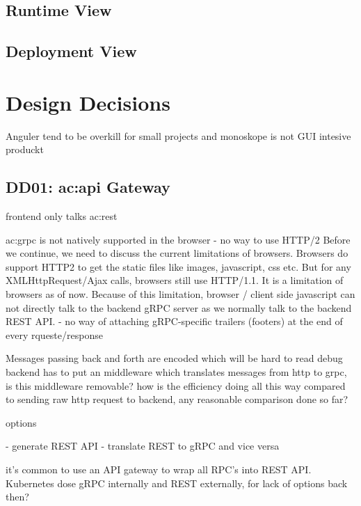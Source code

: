 \subsection{Runtime View}

\subsection{Deployment View}

\section{Design Decisions}

Anguler tend to be overkill for small projects and monoskope is not GUI intesive produckt

\subsection{DD01: \gls{ac:api} Gateway}

frontend only talks \gls{ac:rest}


\gls{ac:grpc} is not natively supported in the browser 
- no way to use HTTP/2
Before we continue, we need to discuss the current limitations of browsers. Browsers do support HTTP2 to get the static files like images, javascript, css etc. But for any XMLHttpRequest/Ajax calls, browsers still use HTTP/1.1. It is a limitation of browsers as of now. Because of this limitation, browser / client side javascript can not directly talk to the backend gRPC server as we normally talk to the backend REST API. 
- no way of attaching gRPC-specific trailers (footers) at the end of every rqueste/response

Messages passing back and forth are encoded which will be hard to read debug
backend has to put an middleware which translates messages from http to grpc, is this middleware removable?
how is the efficiency doing all this way compared to sending raw http request to backend, any reasonable comparison done so far?

options

- generate REST API
- translate REST to gRPC and vice versa


it’s common to use an API gateway to wrap all RPC’s into REST API. Kubernetes dose gRPC internally and REST externally, for lack of options back then?

